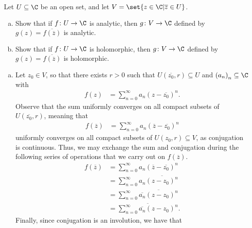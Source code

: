 \documentclass[10pt]{mypackage}
\begin{document}
\begin{problem}[Problem 5]
  Let $U\subseteq \C$ be an open set, and let $V = \set{z\in \C | \overline{z}\in U}$.
  \begin{enumerate}[(a)]
    \item Show that if $f\colon U\rightarrow \C$ is analytic, then $g\colon V\rightarrow \C$ defined by $g(z) = \overline{f\left( \overline{z} \right)}$ is analytic.
    \item Show that if $f\colon U\rightarrow \C$ is holomorphic, then $g\colon V\rightarrow \C$ defined by $g\left( z \right) = \overline{f\left( \overline{z} \right)}$ is holomorphic.
  \end{enumerate}
\end{problem}
\begin{solution}\hfill
  \begin{enumerate}[(a)]
    \item Let $z_0\in V$, so that there exists $r > 0$ such that $U\left( \overline{z_0},r \right)\subseteq U$ and $\left( a_n \right)_n\subseteq \C$ with
      \begin{align*}
        f(z) &= \sum_{n=0}^{\infty} a_n\left( z- \overline{z_0} \right)^{n}.
      \end{align*}
      Observe that the sum uniformly converges on all compact subsets of $U\left( \overline{z_0},r \right)$, meaning that
      \begin{align*}
        f\left( \overline{z} \right) &= \sum_{n=0}^{\infty} a_n \left( \overline{z} - \overline{z_0} \right)^{n}
      \end{align*}
      uniformly converges on all compact subsets of $ U\left( z_0,r \right)\subseteq V $, as conjugation is continuous. Thus, we may exchange the sum and conjugation during the following series of operations that we carry out on $ f\left( \overline{z} \right) $.
      \begin{align*}
        f\left( \overline{z} \right) &= \sum_{n=0}^{\infty} a_n \left( \overline{z}- \overline{z_0} \right)^{n}\\
                                     &= \sum_{n=0}^{\infty} a_n \overline{\left( z-z_0 \right)^{n}}\\
                                     &= \sum_{n=0}^{\infty} \overline{ \overline{a_n} \left( z-z_0 \right)^{n} }\\
                                     &= \overline{\sum_{n=0}^{\infty} \overline{a_n} \left( z-z_0 \right)^{n}}.
      \end{align*}
      Finally, since conjugation is an involution, we have that

\end{enumerate}
\end{solution}
\end{document}
